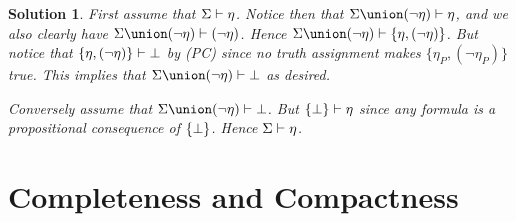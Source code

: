 \documentclass[article, a4paper, 11pt, oneside]{memoir}
\numberwithin{equation}{chapter}
\theoremstyle{nonumberplain}
\newtheorem{solution}{Solution}
\begin{document}
\begin{solution}
    First assume that $\Sigma \vdash \eta$. Notice then that $\Sigma \union (\neg \eta) \proves \eta$, and we also clearly have $\Sigma \union (\neg \eta) \proves (\neg \eta)$. Hence $\Sigma \union (\neg \eta) \proves \{ \eta, (\neg \eta) \}$. But notice that $\{ \eta, (\neg \eta) \} \vdash \bot$ by (PC) since no truth assignment makes $\{ \eta_P, (\neg \eta_P) \}$ true. This implies that $\Sigma \union (\neg \eta) \proves \false$ as desired.

    Conversely assume that $\Sigma \union (\neg \eta) \proves \false$. But $\{ \bot \} \vdash \eta$ since any formula is a propositional consequence of $\{ \bot \}$. Hence $\Sigma \vdash \eta$.
\end{solution}


\chapter{Completeness and Compactness}
\end{document}
